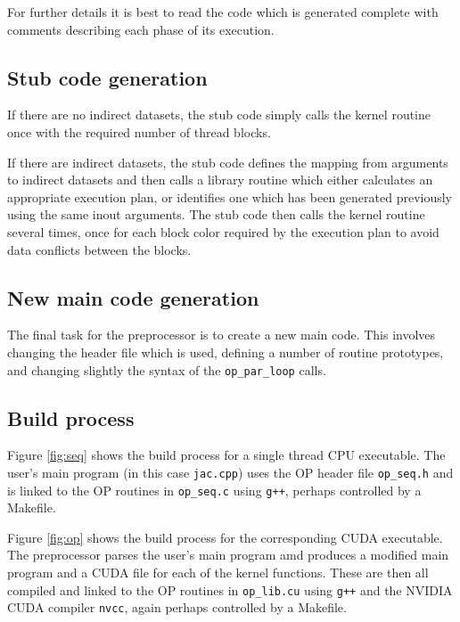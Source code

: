 \documentclass[12pt]{article}
\begin{document}
For further details it is best to read the code which 
is generated complete with comments describing each 
phase of its execution.

\subsection{Stub code generation}

If there are no indirect datasets, the stub code
simply calls the kernel routine once with the required
number of thread blocks.

If there are indirect datasets, the stub code defines
the mapping from arguments to indirect datasets and then
calls a library routine which either calculates an 
appropriate execution plan, or identifies one which has
been generated previously using the same inout arguments.
The stub code then calls the kernel routine several times,
once for each block color required by the execution plan
to avoid data conflicts between the blocks.

\subsection{New main code generation}

The final task for the preprocessor is to create a new main 
code.  This involves changing the header file which is used,
defining a number of routine prototypes, and changing slightly
the syntax of the {\tt op\_par\_loop} calls.

\subsection{Build process}

Figure \ref{fig:seq} shows the build process for a single 
thread CPU executable.  The user's main program (in this case 
{\tt jac.cpp}) uses the OP header file {\tt op\_seq.h} and is 
linked to the OP routines in {\tt op\_seq.c} using {\tt g++},
perhaps controlled by a Makefile.

Figure \ref{fig:op} shows the build process for the corresponding
CUDA executable.  The preprocessor parses the user's main program 
amd produces a modified main program and a CUDA file for 
each of the kernel functions.  These are then all compiled and 
linked to the OP routines in {\tt op\_lib.cu} using {\tt g++}
and the NVIDIA CUDA compiler {\tt nvcc}, again perhaps controlled 
by a Makefile.

\newpage
\end{document}
